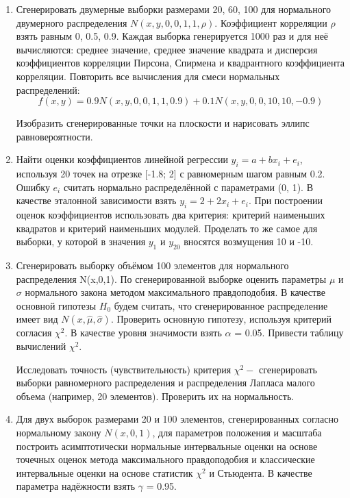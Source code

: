 \documentclass[12pt]{article}
\begin{document}
	\begin{enumerate}
		\item Сгенерировать двумерные выборки размерами 20, 60, 100 для нормального двумерного распределения $N(x,y,0,0,1,1,\rho)$. Коэффициент корреляции $\rho$ взять равным 0, 0.5, 0.9. Каждая выборка генерируется 1000 раз и для неё вычисляются: среднее значение, среднее значение квадрата и дисперсия коэффициентов корреляции Пирсона, Спирмена и квадрантного коэффициента корреляции. Повторить все вычисления для смеси нормальных распределений:
		\begin{equation}
			f(x,y) = 0.9N(x,y,0,0,1,1,0.9) + 0.1N(x,y,0,0,10,10,-0.9)
		\end{equation}
	
		Изобразить сгенерированные точки на плоскости и нарисовать эллипс равновероятности.
		\item Найти оценки коэффициентов линейной регрессии $y_{i} = a + bx_{i} + e_{i}$, используя 20 точек на отрезке [-1.8; 2] с равномерным шагом равным 0.2. Ошибку $e_{i}$ считать нормально распределённой с параметрами (0, 1). В качестве эталонной зависимости взять $y_{i} = 2 + 2x_{i} + e_{i}$. При построении оценок коэффициентов использовать два критерия: критерий наименьших квадратов и критерий наименьших модулей. Проделать то же самое для выборки, у которой в значения $y_{1}$ и $y_{20}$ вносятся возмущения 10 и -10. 
		\item Сгенерировать выборку объёмом 100 элементов для нормального распределения N(x,0,1). По сгенерированной выборке оценить параметры $\mu$ и $\sigma$ нормального закона методом максимального правдоподобия. В качестве основной гипотезы $H_{0}$ будем считать, что сгенерированное распределение имеет вид $N(x,\hat{\mu}, \hat{\sigma})$. Проверить основную гипотезу, используя критерий согласия $\chi^{2}$. В качестве уровня значимости взять $\alpha$ = 0.05. Привести таблицу вычислений $\chi^{2}$. 
		
		Исследовать точность (чувствительность) критерия $\chi^{2} - $ сгенерировать выборки равномерного распределения и распределения Лапласа малого объема (например, 20 элементов). Проверить их на нормальность.
		\item Для двух выборок размерами 20 и 100 элементов, сгенерированных согласно нормальному закону $N(x,0,1)$, для параметров положения и масштаба построить асимптотически нормальные интервальные оценки на основе точечных оценок метода максимального правдоподобия и классические интервальные оценки на основе статистик $\chi^{2}$ и Стьюдента. В качестве параметра надёжности взять $\gamma$ = 0.95.
		
	\end{enumerate}
	
\end{document}
